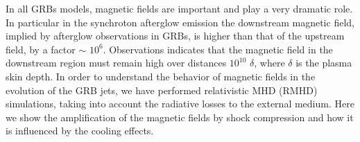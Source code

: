 


\bigskip



\bigskip

\noindent In all GRBs models, magnetic fields are important and play a very dramatic
role. In particular in the synchroton afterglow emission the downstream
magnetic field, implied by afterglow observations in GRBs, is higher than
that of the upstream field, by a factor $\sim$ $10^6$. Observations
indicates that the magnetic field in the downstream region must remain high
over distances $10^{10}$ $\delta$, where $\delta$ is the plasma skin depth. In order to understand the behavior of magnetic fields in the evolution of the GRB jets, we have performed relativistic MHD (RMHD) simulations, taking into account the radiative losses to the external medium. Here we show the amplification of the magnetic fields by shock compression and how it is influenced by the cooling effects.

